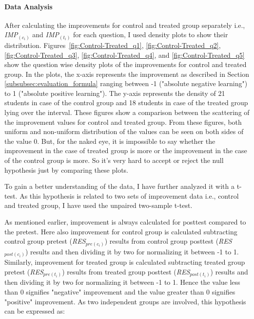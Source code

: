 \paragraph{Data Analysis}
After calculating the improvements for control and treated group separately i.e., \textit{IMP$_{(c_i)}$} and \textit{IMP$_{(t_i)}$} for each question, I used density plots to show their distribution. Figures~\ref{fig:Control-Treated_q1}, \ref{fig:Control-Treated_q2}, \ref{fig:Control-Treated_q3}, \ref{fig:Control-Treated_q4}, and \ref{fig:Control-Treated_q5} show the question wise density plots of the improvements for control and treated group. In the plots, the x-axis represents the improvement as described in Section \ref{subsubsec:evaluation_formula} ranging between -1 ("absolute negative learning") to 1 ("absolute positive learning"). The y-axis represents the density of 21 students in case of the control group and 18 students in case of the treated group lying over the interval. These figures show a comparison between the scattering of the improvement values for control and treated group. From these figures, both uniform and non-uniform distribution of the values can be seen on both sides of the value 0. But, for the naked eye, it is impossible to say whether the improvement in the case of treated group is more or the improvement in the case of the control group is more. So it's very hard to accept or reject the null hypothesis just by comparing these plots.

To gain a better understanding of the data, I have further analyzed it with a t-test. As this hypothesis is related to two sets of improvement data i.e., control and treated group, I have used the unpaired two-sample t-test.   

As mentioned earlier, improvement is always calculated for posttest compared to the pretest. Here also improvement for control group is calculated subtracting control group pretest (\textit{RES$_{pre(c_i)}$}) results from control group posttest (\textit{RES$_{post(c_i)}$}) results and then dividing it by two for normalizing it between -1 to 1. Similarly, improvement for treated group is calculated subtracting treated group pretest (\textit{RES$_{pre(t_i)}$}) results from treated group posttest (\textit{RES$_{post(t_i)}$}) results and then dividing it by two for normalizing it between -1 to 1. Hence the value less than 0 signifies "negative" improvement and the value greater than 0 signifies "positive" improvement. As two independent groups are involved, this hypothesis can be expressed as:   

